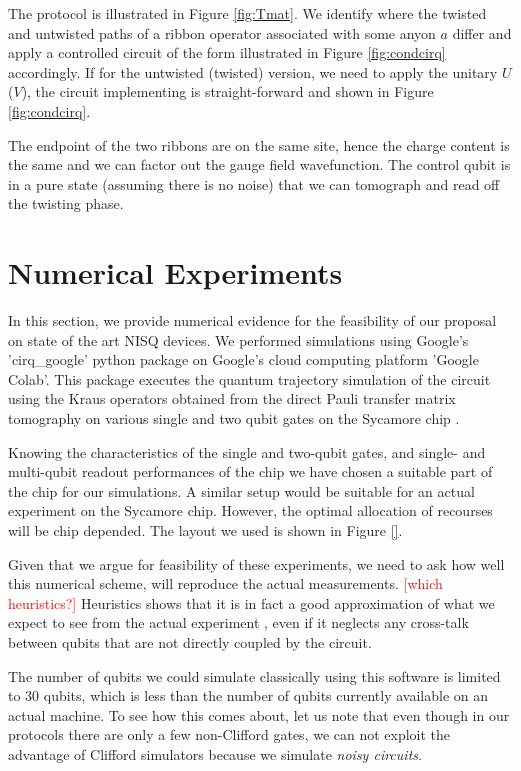 \documentclass[two column]{article}
\newcommand{\caro}[1]{\textcolor{red}{[#1]}}
\begin{document}
The protocol is illustrated in Figure \ref{fig:Tmat}. We identify where the twisted and untwisted paths of a ribbon operator associated with some anyon $a$ differ and apply a controlled circuit of the form illustrated in Figure \ref{fig:condcirq} accordingly. If for the untwisted (twisted) version, we need to apply the unitary $U$ ($V$), the circuit implementing is straight-forward and shown in Figure \ref{fig:condcirq}.

The endpoint of the two ribbons are on the same site, hence the charge content is the same and we can factor out the gauge field wavefunction. 
The control qubit is in a pure state (assuming there is no noise) that we can tomograph and read off the twisting phase.


\section{Numerical Experiments}\label{sec:num}

In this section, we provide numerical evidence for the feasibility of our proposal on state of the art NISQ devices. We performed simulations using Google's 'cirq\_google' python package on Google's cloud computing platform 'Google Colab'. This package executes the quantum trajectory simulation of the circuit using the Kraus operators obtained from the direct Pauli transfer matrix tomography on various single and two qubit gates on the Sycamore chip \cite{}.

Knowing the characteristics of the single and two-qubit gates, and single- and multi-qubit readout performances of the chip \cite{} we have chosen a suitable part of the chip for our simulations. A similar setup would be suitable for an actual experiment on the Sycamore chip. However, the optimal allocation of recourses will be chip depended. The layout we used is shown in Figure \ref{}.

Given that we argue for feasibility of these experiments, we need to ask how well this numerical scheme, will reproduce the actual measurements.
\caro{which heuristics?} Heuristics shows that it is in fact a good approximation of what we expect to see from the actual experiment \cite{}, even if it neglects any cross-talk between qubits that are not directly coupled by the circuit.

The number of qubits we could simulate classically using this software is limited to 30 qubits, which is less than the number of qubits currently available on an actual machine. To see how this comes about, let us note that even though in our protocols there are only a few non-Clifford gates, we can not exploit the advantage of Clifford simulators because we simulate \emph{noisy circuits}. 
\end{document}
